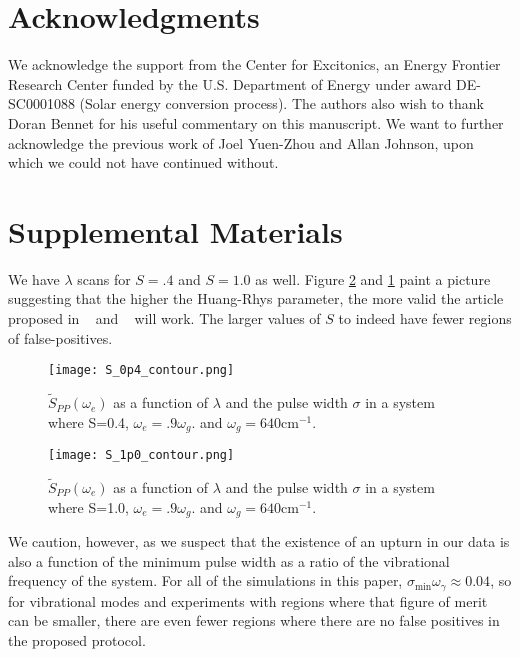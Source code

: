 


\section{Acknowledgments}
We acknowledge the support from the Center for Excitonics, an Energy Frontier Research Center funded by the U.S. Department of Energy under award DE-SC0001088 (Solar energy conversion process).  The authors also wish to thank Doran Bennet for his useful commentary on this manuscript.  We want to further acknowledge the previous work of Joel Yuen-Zhou and Allan Johnson, upon which we could not have continued without.



\section{Supplemental Materials}
We have $\lambda$ scans for $S=.4$ and $S=1.0$ as well.  Figure \ref{fig:s_1p0} and \ref{fig:s_0p4} paint a picture suggesting that the higher the Huang-Rhys parameter, the more valid the article proposed in ~\cite{allanWitness} and ~\cite{witness} will work.  The larger values of $S$ to indeed have fewer regions of false-positives.
\begin{figure}
   \texttt{[image: S\_0p4\_contour.png]}
   \caption{$\tilde{S}_{PP} ( \omega_e)$ as a function of $\lambda$ and the pulse width $\sigma$ in a system where S=0.4, $\omega_e = .9 \omega_g$. and $\omega_g = 640 \text{cm}^{-1}$.}
	\label{fig:s_0p4}
\end{figure}

\begin{figure}
   \texttt{[image: S\_1p0\_contour.png]}
   \caption{$\tilde{S}_{PP} ( \omega_e)$ as a function of $\lambda$ and the pulse width $\sigma$ in a system where S=1.0, $\omega_e = .9 \omega_g$. and $\omega_g = 640 \text{cm}^{-1}$. }
	\label{fig:s_1p0}
\end{figure}
We caution, however, as we suspect that the existence of an upturn in our data  is also a function of the minimum pulse width as a ratio of the vibrational frequency of the system.  For all of the simulations in this paper, $\sigma_{\min} \omega_{\gamma} \approx 0.04 $, so for vibrational modes and experiments with regions where that figure of merit can be smaller, there are even fewer regions where there are no false positives in the proposed protocol.
